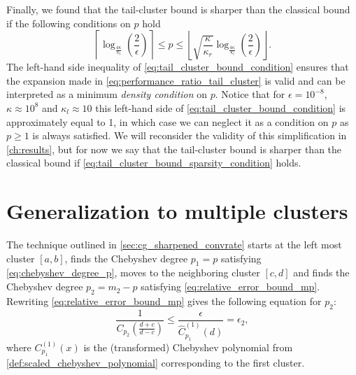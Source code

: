 Finally, we found that the tail-cluster bound is sharper than the classical bound if the following conditions on $p$ hold
\begin{equation}
    \left\lceil\log_{\frac{4\kappa}{\kappa_l}}\left(\frac{2}{\epsilon}\right)\right\rceil \leq p \leq \left\lfloor\sqrt{\frac{\kappa}{\kappa_r}}\log_{\frac{4\kappa}{\kappa_l}}\left(\frac{2}{\epsilon}\right)\right\rfloor.
    \label{eq:tail_cluster_bound_condition}
\end{equation}
The left-hand side inequality of \cref{eq:tail_cluster_bound_condition} ensures that the expansion made in \cref{eq:performance_ratio_tail_cluster} is valid and can be interpreted as a minimum \textit{density condition} on $p$. Notice that for $\epsilon = 10^{-8}$, $\kappa\approx 10^{8}$ and $\kappa_l\approx 10$ this left-hand side of \cref{eq:tail_cluster_bound_condition} is approximately equal to 1, in which case we can neglect it as a condition on $p$ as $p\geq 1$ is always satisfied. We will reconsider the validity of this simplification in \cref{ch:results}, but for now we say that the tail-cluster bound is sharper than the classical bound if \cref{eq:tail_cluster_bound_sparsity_condition} holds.

\section{Generalization to multiple clusters}\label{sec:multiple_clusters}
The technique outlined in \cref{sec:cg_sharpened_convrate} starts at the left most cluster $[a,b]$, finds the Chebyshev degree $p_1=p$ satisfying \cref{eq:chebyshev_degree_p}, moves to the neighboring cluster $[c,d]$ and finds the Chebyshev degree $p_2 = m_2 - p$ satisfying \cref{eq:relative_error_bound_mp}. Rewriting \cref{eq:relative_error_bound_mp} gives the following equation for $p_2$:
\begin{equation}
    \frac{1}{C_{p_2}\left(\frac{d+c}{d-c}\right)} \leq \frac{\epsilon}{\hat{C}^{(1)}_{p_1}(d)} = \epsilon_2,
    \label{eq:chebyshev_degree_p_prime}
\end{equation}
where $C^{(1)}_{p_1}(x)$ is the (transformed) Chebyshev polynomial from \cref{def:scaled_chebyshev_polynomial} corresponding to the first cluster.

